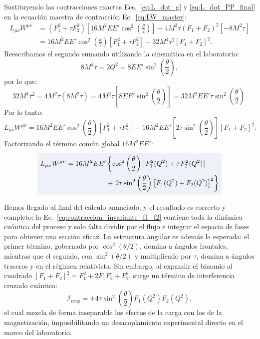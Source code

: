 \documentclass[10pt,a4paper]{article}
\newcommand{\dest}[1]{{\setlength{\fboxsep}{4pt}\colorbox{colordest}{$\displaystyle #1$}}}
\begin{document}
Sustituyendo las contracciones exactas Ecs.~\eqref{eq:L_dot_g} y \eqref{eq:L_dot_PP_final} en la ecuación maestra de contracción Ec.~\eqref{eq:LW_master}:
\begin{align}
L_{\mu\nu} W^{\mu\nu} &= (F_1^2 + \tau F_2^2) \left[ 16 M^2 E E' \cos^2\left(\frac{\theta}{2}\right) \right] - 4 M^2 \tau (F_1 + F_2)^2 \left[ -8 M^2 \tau \right] \nonumber \\
&= 16 M^2 E E' \cos^2\left(\frac{\theta}{2}\right) [F_1^2 + \tau F_2^2] + 32 M^4 \tau^2 [F_1 + F_2]^2.
\end{align}
Reescribamos el segundo sumando utilizando la cinemática en el laboratorio:
\begin{equation}
8 M^2 \tau = 2 Q^2 = 8 E E' \sin^2\left(\frac{\theta}{2}\right),
\end{equation}
por lo que:
\begin{equation}
32 M^4 \tau^2 = 4 M^2 \tau (8 M^2 \tau) = 4 M^2 \tau \left[ 8 E E' \sin^2\left(\frac{\theta}{2}\right) \right] = 32 M^2 E E' \tau \sin^2\left(\frac{\theta}{2}\right).
\end{equation}
Por lo tanto:
\begin{equation}
L_{\mu\nu} W^{\mu\nu} = 16 M^2 E E' \cos^2\left(\frac{\theta}{2}\right) [F_1^2 + \tau F_2^2] + 16 M^2 E E' \left[ 2 \tau \sin^2\left(\frac{\theta}{2}\right) \right] [F_1 + F_2]^2.
\end{equation}
Factorizando el término común global $16 M^2 E E'$:
\begin{align}
\dest{
\begin{aligned}
L_{\mu\nu} W^{\mu\nu} = 16 M^2 E E' &\left\{ \cos^2\left(\frac{\theta}{2}\right) \left[ F_1^2(Q^2) + \tau F_2^2(Q^2) \right] \right. \\
&+ \left. 2\tau \sin^2\left(\frac{\theta}{2}\right) \left[ F_1(Q^2) + F_2(Q^2) \right]^2 \right\}
\end{aligned}
}
\label{eq:contraccion_invariante_f1_f2}
\end{align}

Hemos llegado al final del cálculo anunciado, y el resultado es correcto y completo: la Ec.~\eqref{eq:contraccion_invariante_f1_f2} contiene toda la dinámica cuántica del proceso y solo falta dividir por el flujo e integrar el espacio de fases para obtener una sección eficaz. La estructura angular es además la esperada: el primer término, gobernado por $\cos^2(\theta/2)$, domina a ángulos frontales, mientras que el segundo, con $\sin^2(\theta/2)$ y multiplicado por $\tau$, domina a ángulos traseros y en el régimen relativista. Sin embargo, al expandir el binomio al cuadrado $[F_1 + F_2]^2 = F_1^2 + 2 F_1 F_2 + F_2^2$, surge un término de interferencia cruzado cuántico:
\begin{equation}
\mathcal{I}_{\text{cruz}} = + 4 \tau \sin^2\left(\frac{\theta}{2}\right) F_1(Q^2) F_2(Q^2),
\end{equation}
el cual mezcla de forma inseparable los efectos de la carga con los de la magnetización, imposibilitando un desacoplamiento experimental directo en el marco del laboratorio.
\end{document}
